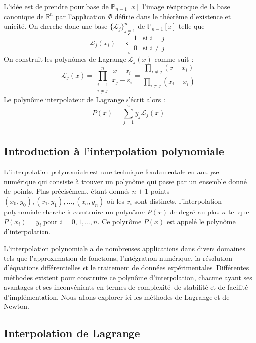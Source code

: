 \documentclass[oneside]{book}
\begin{document}
L'idée est de prendre pour base de $\mathbb{P}_{n-1}[x]$ l'image réciproque de la base canonique de $\mathbb{R}^n$ par l'application $\Phi$ définie dans le théorème d'existence et unicité.
On cherche donc une base $\{\mathcal{L}_j\}_{j=1}^n$ de $\mathbb{P}_{n-1}[x]$ telle que
\[
\mathcal{L}_j(x_i) = \begin{cases} 1 & \text{si } i = j \\ 0 & \text{si } i \neq j \end{cases}
\]
On construit les polynômes de Lagrange $\mathcal{L}_j(x)$ comme suit :
\[
\mathcal{L}_j(x) = \prod_{\substack{i=1 \\ i \neq j}}^n \frac{x-x_i}{x_j-x_i} = \frac{\prod_{i \neq j} (x-x_i)}{\prod_{i \neq j} (x_j-x_i)}
\]
Le polynôme interpolateur de Lagrange s'écrit alors :
\[
P(x) = \sum_{j=1}^n y_j \mathcal{L}_j(x)
\]\chapter{}
\sloppy

\section{Introduction à l'interpolation polynomiale}

L'interpolation polynomiale est une technique fondamentale en analyse numérique qui consiste à trouver un polynôme qui passe par un ensemble donné de points. Plus précisément, étant donnés $n+1$ points $(x_0, y_0), (x_1, y_1), \dots, (x_n, y_n)$ où les $x_i$ sont distincts, l'interpolation polynomiale cherche à construire un polynôme $P(x)$ de degré au plus $n$ tel que $P(x_i) = y_i$ pour $i = 0, 1, \dots, n$. Ce polynôme $P(x)$ est appelé le polynôme d'interpolation.

L'interpolation polynomiale a de nombreuses applications dans divers domaines tels que l'approximation de fonctions, l'intégration numérique, la résolution d'équations différentielles et le traitement de données expérimentales.  Différentes méthodes existent pour construire ce polynôme d'interpolation, chacune ayant ses avantages et ses inconvénients en termes de complexité, de stabilité et de facilité d'implémentation. Nous allons explorer ici les méthodes de Lagrange et de Newton.

\section{Interpolation de Lagrange}
\end{document}
